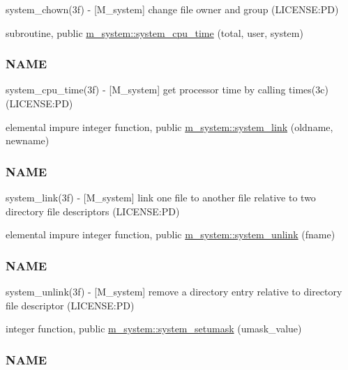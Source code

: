 \begin{DoxyCompactItemize}
\begin{DoxyCompactList}
system\+\_\+chown(3f) -\/ \mbox{[}M\+\_\+system\mbox{]} change file owner and group (L\+I\+C\+E\+N\+SE\+:PD) \end{DoxyCompactList}\item 
subroutine, public \mbox{\hyperlink{namespacem__system_a257d2b8987db850bc686507f19ccbe4a}{m\+\_\+system\+::system\+\_\+cpu\+\_\+time}} (total, user, system)
\begin{DoxyCompactList}\small\item\em \subsubsection*{N\+A\+ME}

system\+\_\+cpu\+\_\+time(3f) -\/ \mbox{[}M\+\_\+system\mbox{]} get processor time by calling times(3c) (L\+I\+C\+E\+N\+SE\+:PD) \end{DoxyCompactList}\item 
elemental impure integer function, public \mbox{\hyperlink{namespacem__system_a0e04b5499fc3367eda9758b6e396a103}{m\+\_\+system\+::system\+\_\+link}} (oldname, newname)
\begin{DoxyCompactList}\small\item\em \subsubsection*{N\+A\+ME}

system\+\_\+link(3f) -\/ \mbox{[}M\+\_\+system\mbox{]} link one file to another file relative to two directory file descriptors (L\+I\+C\+E\+N\+SE\+:PD) \end{DoxyCompactList}\item 
elemental impure integer function, public \mbox{\hyperlink{namespacem__system_a3561c9beafec28439f760d701d55a6b8}{m\+\_\+system\+::system\+\_\+unlink}} (fname)
\begin{DoxyCompactList}\small\item\em \subsubsection*{N\+A\+ME}

system\+\_\+unlink(3f) -\/ \mbox{[}M\+\_\+system\mbox{]} remove a directory entry relative to directory file descriptor (L\+I\+C\+E\+N\+SE\+:PD) \end{DoxyCompactList}\item 
integer function, public \mbox{\hyperlink{namespacem__system_a04fd02e6f5ce2f8ecdfb577e1490feba}{m\+\_\+system\+::system\+\_\+setumask}} (umask\+\_\+value)
\begin{DoxyCompactList}\small\item\em \subsubsection*{N\+A\+ME}


\end{DoxyCompactList}
\end{DoxyCompactItemize}
